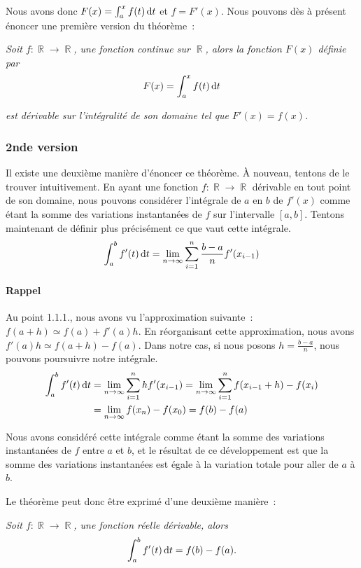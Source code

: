 \documentclass{article}
\DeclareMathOperator{\R}{\mathbb R}
\theoremstyle{definition}
\theoremstyle{remark}
\begin{document}
				Nous avons donc $F(x) = \int_a^xf(t)\dif t$ et $f = F'(x)$. Nous pouvons dès à présent énoncer une première version du théorème~:

				\textit{Soit $f : \R \to \R$, une fonction continue sur $\R$, alors la fonction $F(x)$ définie par}
				\[F(x) = \int_a^xf(t)\dif t\]

				\textit{est dérivable sur l'intégralité de son domaine tel que $F'(x) = f(x)$.}

		\subsubsection{2nde version}
				Il existe une deuxième manière d'énoncer ce théorème. À nouveau, tentons de le trouver intuitivement. En ayant une fonction
				$f : \R \to \R$ dérivable en tout point de son domaine, nous pouvons considérer l'intégrale de $a$ en $b$ de $f'(x)$
				comme étant la somme des variations instantanées de $f$ sur l'intervalle $[a, b]$. Tentons maintenant de définir plus précisément
				ce que vaut cette intégrale.
				\[\int_a^bf'(t)\dif t = \lim_{n \to \infty}\sum_{i=1}^n\frac {b-a}{n}f'(x_{i-1})\]

				\paragraph{Rappel} Au point 1.1.1., nous avons vu l'approximation suivante~: $f(a+h) \simeq f(a) + f'(a)h$. En réorganisant cette
				approximation, nous avons $f'(a)h \simeq f(a+h) - f(a)$. Dans notre cas, si nous posons $h = \frac {b-a}{n}$, nous pouvons poursuivre
				notre intégrale.
				\[
					\begin{aligned}
						\int_a^bf'(t)\dif t &= \lim_{n \to \infty}\sum_{i=1}^nhf'(x_{i-1}) =  \lim_{n \to \infty}\sum_{i=1}^nf(x_{i-1} + h) - f(x_i) \\
											&=  \lim_{n \to \infty}f(x_n) - f(x_0) = f(b) - f(a)
					\end{aligned}
				\]

				Nous avons considéré cette intégrale comme étant la somme des variations instantanées de $f$ entre $a$ et $b$, et le résultat de
				ce développement est que la somme des variations instantanées est égale à la variation totale pour aller de $a$ à $b$.

				Le théorème peut donc être exprimé d'une deuxième manière~:

				\textit{Soit $f : \R \to \R$, une fonction réelle dérivable, alors}
				\[\int_a^bf'(t)\dif t = f(b) - f(a).\]
\end{document}
